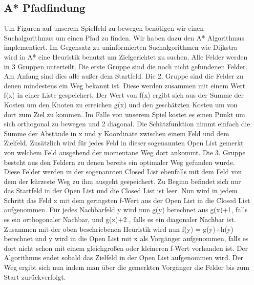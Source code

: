 \documentclass[extern,palatino]{cgBA}
\begin{document}
\subsection{A* Pfadfindung}\label{Pfadfindung}
Um Figuren auf unserem Spielfeld zu bewegen benötigen wir einen Suchalgorithmus um einen Pfad zu finden. Wir haben dazu den A* Algorithmus implementiert. Im Gegensatz zu uninformierten Suchalgorithmen wie Dijkstra wird in A* eine Heuristik benutzt um Zielgerichtet zu suchen. Alle Felder werden in 3 Gruppen unterteilt. Die erste Gruppe sind die noch nicht gefundenen Felder. Am Anfang sind dies alle außer dem Startfeld. Die 2. Gruppe sind die Felder zu denen mindestens ein Weg bekannt ist. Diese werden zusammen mit einem Wert f(x) in einer Liste gespeichert. Der Wert von f(x) ergibt sich aus der Summe der Kosten um den Knoten zu erreichen g(x) und den geschätzten Kosten um von dort zum Ziel zu kommen. Im Falle von unserem Spiel kostet es einen Punkt um sich orthogonal zu bewegen und 2 diagonal. Die Schätzfunktion nimmt einfach die Summe der Abstände in x und y Koordinate zwischen einem Feld und dem Zielfeld. Zusätzlich wird für jedes Feld in dieser sogenannten Open List gemerkt von welchem Feld ausgehend der momentane Weg dort ankommt. Die 3. Gruppe besteht aus den Feldern zu denen bereits ein optimaler Weg gefunden wurde. Diese Felder werden in der sogenannten Closed List ebenfalls mit dem Feld von dem der kürzeste Weg zu ihm ausgeht gespeichert.
Zu Beginn befindet sich nur das Startfeld in der Open List und die Closed List ist leer. Nun wird in jedem Schritt das Feld x mit dem geringsten f-Wert aus der Open List in die Closed List aufgenommen. Für jedes Nachbarfeld y wird nun g(y) berechnet aus g(x)+1, falls es ein orthogonaler Nachbar, und g(x)+2 , falls es ein diagonaler Nachbar ist. Zusammen mit der oben beschriebenen Heuristik wird nun f(y) = g(y)+h(y) berechnet und y wird in die Open List mit x als Vorgänger aufgenommen, falls es dort nicht schon mit einem gleichgroßen oder kleineren f-Wert vorhanden ist. Der Algorithmus endet sobald das Zielfeld in der Open List aufgenommen wird. Der Weg ergibt sich nun indem man über die gemerkten Vorgänger die Felder bis zum Start zurückverfolgt.
\end{document}
